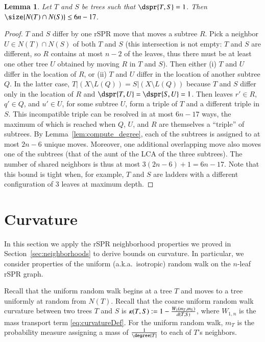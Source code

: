 \documentclass[]{elsarticle}
\newtheorem{lem}[thm]{Lemma}
\newcommand{\curvature}[2][]{%
    \ifthenelse{\equal{#1}{}}%
		{\kappa(#2)}%
		{\kappa_{#1}(#2)}%
}
\begin{document}
\begin{lem}
	\label{lem:shared_neighbors}
Let $T$ and $S$ be trees such that $\dspr{T,S} = 1$.
Then $\size{N(T) \cap N(S)} \le 6n - 17$.
\end{lem}
\begin{proof}
	$T$ and $S$ differ by one rSPR move that moves a subtree $R$.
	Pick a neighbor $U \in N(T) \cap N(S)$ of both $T$ and $S$ (this intersection is not empty: $T$ and $S$ are different, so $R$ contains at most $n-2$ of the leaves, thus there must be at least one other tree $U$ obtained by moving $R$ in $T$ and $S$).
	Then either (i) $T$ and $U$ differ in the location of $R$, or (ii) $T$ and $U$ differ in the location of another subtree $Q$.
	In the latter case, $T|(X \setminus L(Q)) = S|(X \setminus L(Q))$ because $T$ and $S$ differ only in the location of $R$ and $\dspr{T,U} = \dspr{S,U} = 1$.
	Then leaves $r' \in R$, $q' \in Q$, and $u' \in U$, for some subtree $U$, form a triple of $T$ and a different triple in $S$.
	This incompatible triple can be resolved in at most $6n - 17$ ways, the maximum of which is reached when $Q$, $U$, and $R$ are themselves a ``triple'' of subtrees.
	By Lemma~\ref{lem:compute_degree}, each of the subtrees is assigned to at most $2n-6$ unique moves.
	Moreover, one additional overlapping move also moves one of the subtrees (that of the aunt of the LCA of the three subtrees).
	The number of shared neighbors is thus at most $3(2n-6) + 1 = 6n-17$.
	Note that this bound is tight when, for example, $T$ and $S$ are ladders with a different configuration of 3 leaves at maximum depth.
\end{proof}




\section{Curvature}
\label{sec:curvature}
In this section we apply the rSPR neighborhood properties we proved in Section~\ref{sec:neighborhoods} to derive bounds on curvature.
In particular, we consider properties of the uniform (a.k.a.\ isotropic) random walk on the $n$-leaf rSPR graph.

Recall that the uniform random walk begins at a tree $T$ and moves to a tree uniformly at random from $N(T)$.
Recall that the coarse uniform random walk curvature between two trees $T$ and $S$ is $\curvature{T, S} := 1 - \frac{W_1(m_T, m_S)}{d(T, S)}$, where $W_{1,n}$ is the mass transport term \eqref{eq:curvatureDef}.
For the uniform random walk, $m_T$ is the probability measure assigning a mass of $\frac{1}{\degree{T}}$ to each of $T$'s neighbors.
\end{document}
